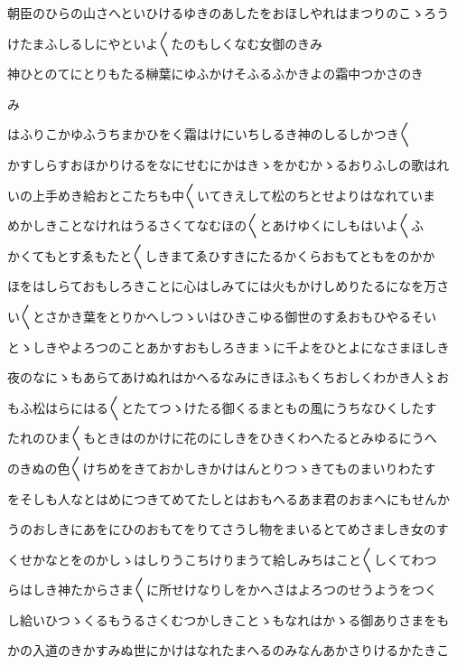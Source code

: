 \documentclass[a4paper,11pt,landscape]{ltjtarticle}
\begin{document}
\par\medskip
朝臣のひらの山さへといひけるゆきのあしたをおほしやれはまつりのこゝろう
\par\medskip
けたまふしるしにやといよ〱たのもしくなむ女御のきみ
\par\medskip
神ひとのてにとりもたる榊葉にゆふかけそふるふかきよの霜中つかさのき
\par\medskip
み
\par\medskip
はふりこかゆふうちまかひをく霜はけにいちしるき神のしるしかつき〱
\par\medskip
かすしらすおほかりけるをなにせむにかはきゝをかむかゝるおりふしの歌はれ
\par\medskip
いの上手めき給おとこたちも中〱いてきえして松のちとせよりはなれていま
\par\medskip
めかしきことなけれはうるさくてなむほの〱とあけゆくにしもはいよ〱ふ
\par\medskip
かくてもとすゑもたと〱しきまてゑひすきにたるかくらおもてともをのかか
\par\medskip
ほをはしらておもしろきことに心はしみてには火もかけしめりたるになを万さ
\par\medskip
い〱とさかき葉をとりかへしつゝいはひきこゆる御世のすゑおもひやるそい
\par\medskip
とゝしきやよろつのことあかすおもしろきまゝに千よをひとよになさまほしき
\par\medskip
夜のなにゝもあらてあけぬれはかへるなみにきほふもくちおしくわかき人〻お
\par\medskip
もふ松はらにはる〱とたてつゝけたる御くるまともの風にうちなひくしたす
\par\medskip
たれのひま〱もときはのかけに花のにしきをひきくわへたるとみゆるにうへ
\par\medskip
のきぬの色〱けちめをきておかしきかけはんとりつゝきてものまいりわたす
\par\medskip
をそしも人なとはめにつきてめてたしとはおもへるあま君のおまへにもせんか
\par\medskip
うのおしきにあをにひのおもてをりてさうし物をまいるとてめさましき女のす
\par\medskip
くせかなとをのかしゝはしりうこちけりまうて給しみちはこと〱しくてわつ
\par\medskip
らはしき神たからさま〱に所せけなりしをかへさはよろつのせうようをつく
\par\medskip
し給いひつゝくるもうるさくむつかしきことゝもなれはかゝる御ありさまをも
\par\medskip
かの入道のきかすみぬ世にかけはなれたまへるのみなんあかさりけるかたきこ
\end{document}
